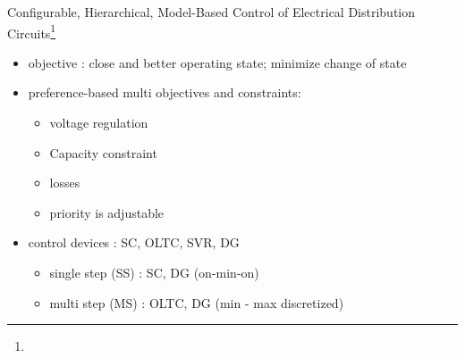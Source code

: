 \documentclass[10pt]{beamer}
\begin{document}
\begin{frame}{Configurable, Hierarchical, Model-Based Control of Electrical Distribution Circuits\footnote{}  }
\begin{itemize}
 \item objective : close and better operating state; minimize change of state
 \item preference-based multi objectives and constraints:
  \begin{itemize}
    \item voltage regulation
    \item Capacity constraint
    \item losses
    \item priority is adjustable
  \end{itemize}
 \item control devices : SC, OLTC, SVR, DG
   \begin{itemize}
    \item single step (SS) : SC, DG (on-min-on)
    \item multi step (MS) : OLTC, DG (min - max discretized)
    \end{itemize}

\end{itemize}
\end{frame}
%
%
%

\end{document}
